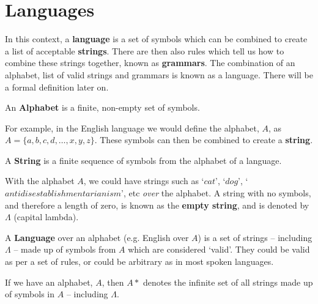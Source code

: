 
\section*{Languages}

In this context, a \textbf{language} is a set of symbols which can be combined to create a list of acceptable \textbf{strings}.
 There are then also rules which tell us how to combine these strings together, known as \textbf{grammars}. The 
 combination of an alphabet, list of valid strings and grammars is known as a language. There will be a formal definition
 later on.

\begin{definition*}{}{}
  An \textbf{Alphabet} is a finite, non-empty set of symbols.
\end{definition*}

For example, in the English language we would define the alphabet, $A$, as $A = \{a, b, c, d, \ldots, x, y, z\}$. These
 symbols can then be combined to create a \textbf{string}.

\begin{definition*}{}{}
  A \textbf{String} is a finite sequence of symbols from the alphabet of a language.
\end{definition*}

With the alphabet $A$, we could have strings such as `$cat$', `$dog$', `$antidisestablishmentarianism$', etc \textit{over} the
 alphabet. A string with no symbols, and therefore a length of zero, is known as the \textbf{empty string}, and is
 denoted by $\Lambda$ (capital lambda).

\begin{definition*}{}{}
  A \textbf{Language} over an alphabet (e.g. English over $A$) is a set of strings -- including $\Lambda$ -- made up of
   symbols from $A$ which are considered `valid'. They could be valid as per a set of rules, or could be arbitrary as
   in most spoken languages.
\end{definition*}

If we have an alphabet, $A$, then $A*$ denotes the infinite set of all strings made up of symbols in $A$ -- including
 $\Lambda$.